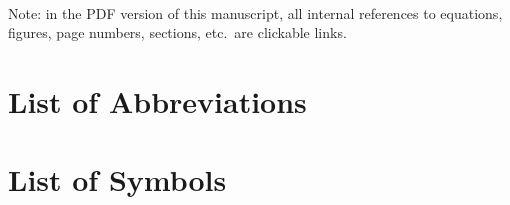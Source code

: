 



\frontmatter%
\maketitle

% 
% 

\tableofcontents
\hrulefill\\
Note: in the PDF version of this manuscript, all internal references to equations, figures, page numbers, sections, etc.\ are clickable links.

\chapter{List of Abbreviations}
\printacronyms[pages={display=all,seq/use=false},heading=none,exclude={sym,math}]

\chapter{List of Symbols}
\printacronyms[pages={display=all,seq/use=false},heading=none,include=sym]

\listoffigures

\mainmatter%
% 

% 
% 
% 

\printbibliography%
\appendix
% 

